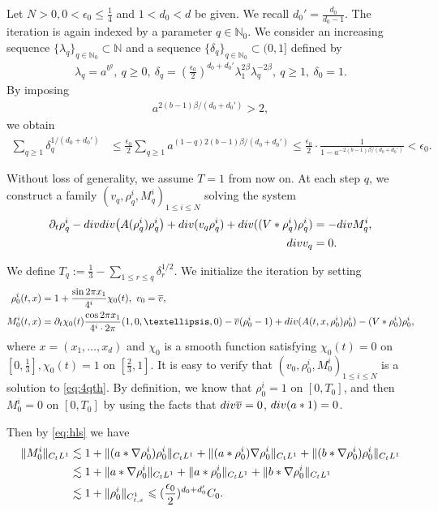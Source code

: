 \documentclass[10pt,a4paper]{amsart}
\numberwithin{equation}{section}
\def\geq{\geqslant}
\def\leq{\leqslant}
\def\div{\mathord{{\rm div}}}
\def\geq{\geqslant}
\def\leq{\leqslant}
\def\div{\mathord{{\rm div}}}
\begin{document}
Let $N>0,0<\epsilon_0\leq \frac14$ and $1<d_0<d$ be given. We recall $d_0'=\frac{d_0}{d_0-1}$. The iteration is again indexed by a parameter
$
q\in\mathbb{N}_0.
$
We consider an increasing sequence
$
\{\lambda_q\}_{q\in\mathbb{N}_0}\subset\mathbb{N}
$
and a sequence
$
\{\delta_q\}_{q\in\mathbb{N}_0}\subset(0,1]
$
defined  by \begin{align*}
\lambda_q
=
a^{b^q},
\ 
q\geq0,
\ 
\delta_q
=
(\frac{\epsilon_0}{2})^{d_0+d_0'}
\lambda_1^{2\beta}
\lambda_q^{-2\beta},
\ 
q\geq1,
\ 
\delta_0=1.
\end{align*} By imposing
\begin{align}
a^{2(b-1)\beta/(d_0+d_0')}>2,
\label{ieq:6ab2}
\end{align}
we obtain
\begin{align*}
\sum_{q\geq1}\delta_q^{1/(d_0+d_0')}
&\leq
\frac{\epsilon_0}{2} 
\sum_{q\geq1}
a^{(1-q)2(b-1)\beta/(d_0+d_0')}\leq
\frac{\epsilon_0}{2}
\cdot
\frac1{1-a^{-2(b-1)\beta/(d_0+d_0')}}
<
\epsilon_0.
\end{align*}
 
 

Without loss of generality, we assume $T=1$ from now on. 
At each step $q$, we construct a family
$(v_q,\rho_q^i,M_q^i)_{1\leq i\leq {N}}$
solving the system
\begin{align}\label{eq:6qth}
\partial_t\rho_q^i
-
\div\div\bigl(A(\rho_q^i)\rho_q^i\bigr)
+
\div(v_q\rho_q^i)+\div((V*\rho_q^i)\rho_q^i)
&=
-\div M_q^i,
\\
\div v_q&=0.
\notag
\end{align} 

We define 
$
T_q:=\frac13-\sum_{1\leq r\leq q}\delta_r^{1/2}.
$ 
We initialize the iteration by setting
\begin{align*}
\rho_0^i(t,x)
&=
1+\frac{\sin2\pi x_1}{4^i}\chi_0(t),
 \ 
v_0=\overline v,\\
M_0^i(t,x)
&=
\partial_t\chi_0(t)\frac{\cos2\pi x_1}{4^i\cdot 2\pi}(1,0,\dots,0)
-\overline v(\rho_0^i-1)  +
\div( A(t,x,\rho_0^i) \rho_0^i)-(V*\rho_0^i)\rho_0^i,
\end{align*}
where $x=(x_1,\dots,x_d)$ and $\chi_0$ is a smooth function satisfying
$
\chi_0(t)=0 $ on $
 [0,\frac13 ], \chi_0(t)=1$ on $[\frac23,1 ].
$   It is easy to verify that $(v_0,\rho^{i}_0,  M^{i}_0)_{1\leq i\leq N}$ is a solution to \eqref{eq:4qth}.   By definition, we know that $\rho_0^i=1$ on $[0,T_0]$, and then $M_0^i=0$ on $[0,T_0]$  by using the facts that $\div \overline v=0$, $\div(a*1)=0$.

Then by \eqref{eq:hls}  we have 
\begin{align}
    \| M^i_0\|_{C_tL^1}&\lesssim 1+\|(a*\nabla \rho_0^i)\rho_0^i\|_{C_tL^1}+\|(a*
\rho^i_0)\nabla \rho^i_0\|_{C_tL^1}+\|(b*
\nabla\rho^i_0) \rho^i_0\|_{C_tL^1}\notag\\
&\lesssim 1+\|a*\nabla \rho_0^i\|_{C_tL^1}+\|a*
\rho^i_0\|_{C_tL^1}+\|b*\nabla
\rho^i_0\|_{C_tL^1}\notag\\
&\lesssim 1+\|\rho^i_0\|_{C_{t,x}^1}\leq
(\frac{\epsilon_0}{2})^{d_0+d_0'}C_0.\label{bd:6rho_0,M_02}
 \end{align}
 
\end{document}
